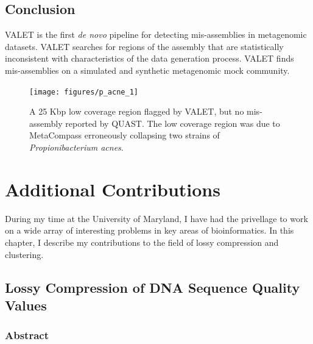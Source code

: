 \documentclass[12pt,\mydriver]{thesis}
\begin{document}
\section{Conclusion}

VALET is the first \emph{de novo} pipeline for detecting mis-assemblies in metagenomic datasets.
VALET searches for regions of the assembly that are statistically inconsistent with characteristics of the data generation process.
VALET finds mis-assemblies on a simulated and synthetic metagenomic mock community.

\begin{landscape}
\renewcommand{\baselinestretch}{1}
\small\normalsize
\begin{figure}[tb!]
\begin{center}
\texttt{[image: figures/p\_acne\_1]}
\end{center}
\renewcommand{\baselinestretch}{1}
\small\normalsize
\begin{quote}
\caption[Examining a 25 Kbp region flagged by VALET]{A 25 Kbp low coverage region flagged by VALET, but no mis-assembly reported by QUAST. The low coverage region was due to MetaCompass erroneously collapsing two strains of \emph{Propionibacterium acnes}.}
\label{fig:p_acnes}
\end{quote}
\end{figure}
\renewcommand{\baselinestretch}{2}
\small\normalsize
\end{landscape}
\clearpage{}
\clearpage{}
\renewcommand{\thechapter}{6}

\chapter{Additional Contributions}

During my time at the University of Maryland, I have had the privellage to work on a wide array of interesting problems in key areas of bioinformatics. In this chapter, I describe my contributions to the field of lossy compression and clustering.

\section{Lossy Compression of DNA Sequence Quality Values}

\subsection{Abstract}
\end{document}
